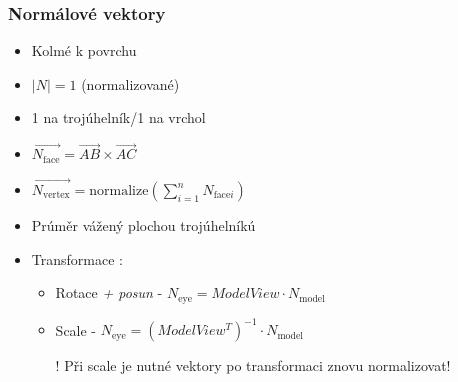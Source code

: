 \begin{frame}
    \frametitle{Normálové vektory}

    \begin{itemize}
        \item Kolmé k povrchu
        \item $\left| N \right| = 1$ (normalizované)
        \item 1 na trojúhelník/1 na vrchol
        \vfill
        \item $\displaystyle \vec{N_{\mathrm{face}}} = \vec{AB} \times \vec{AC}$
        \item $\displaystyle \vec{N_{\mathrm{vertex}}} = \mathrm{normalize}\left( \sum\limits_{i=1}^n N_{\mathrm{face}i} \right)$
        \item Prúměr vážený plochou trojúhelníkú
        \vfill
        \item Transformace :
        \begin{itemize}
            \item Rotace \emph{+ posun} - $N_{\mathrm{eye}} = ModelView \cdot N_{\mathrm{model}}$
            \item Scale - $N_{\mathrm{eye}} = (ModelView^T)^{-1} \cdot N_{\mathrm{model}}$
            \item[\color{red}!] Při scale je nutné vektory po transformaci znovu normalizovat!
        \end{itemize}
    \end{itemize}
\end{frame}


